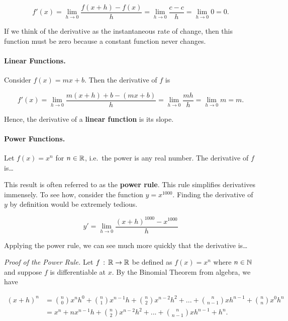 \documentclass[12pt]{article}
\begin{document}
$$f'(x)=\lim_{h\to 0}\frac{f(x+h)-f(x)}{h}=\lim_{h\to 0}\frac{c-c}{h}=\lim_{h\to 0}0=0.$$

\vspace{3mm}

If we think of the derivative as the instantaneous rate of change, then this function must be zero because a constant function never changes.

\newpage

\paragraph{Linear Functions.} Consider $f(x)=mx+b$. Then the derivative of $f$ is

$$f'(x)=\lim_{h\to 0}\frac{m(x+h)+b-(mx+b)}{h}=\lim_{h\to 0}\frac{mh}{h}=\lim_{h\to 0}m=m.$$

\vspace{3mm}

Hence, the derivative of a \textbf{linear function} is its slope.

\vspace{40mm}

\paragraph{Power Functions.} Let $f(x)=x^n$ for $n\in\mathbb{R}$, i.e.\ the power is any real number. The derivative of $f$ is\dots 

\vspace{20mm}

This result is often referred to as the \textbf{power rule}. This rule simplifies derivatives immensely. To see how, consider the function $y=x^{1000}$. Finding the derivative of $y$ by definition would be extremely tedious.

$$y'=\lim_{h\to 0}\frac{(x+h)^{1000}-x^{1000}}{h}$$

\vspace{3mm}

Applying the power rule, we can see much more quickly that the derivative is\dots

\vspace{15mm}

\textit{Proof of the Power Rule.} Let $f\, :\, \mathbb{R}\rightarrow \mathbb{R}$ be defined as $f(x)=x^n$ where $n\in\mathbb{N}$ and suppose $f$ is differentiable at $x$. By the Binomial Theorem from algebra, we have

\begin{align*}
(x+h)^{n} &= {n \choose 0}x^{n}h^{0} + {n \choose 1}x^{n-1}h + {n \choose 2}x^{n-2}h^{2} + ... + {n \choose n-1}xh^{n-1} + {n \choose n}x^{0}h^{n}\\ &= x^{n} + nx^{n-1}h + {n \choose 2}x^{n-2}h^{2} + ... + {n \choose n-1}xh^{n-1} + h^{n}.
\end{align*}
\end{document}
